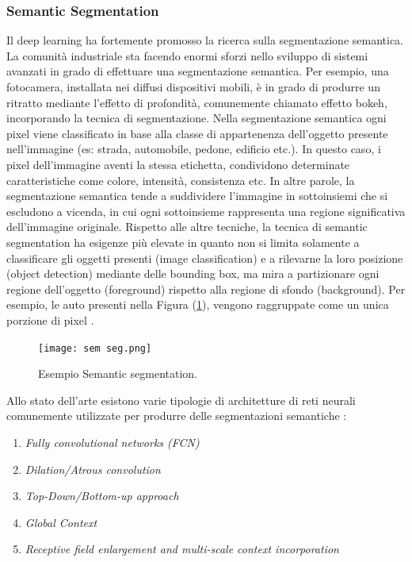 \subsubsection{Semantic Segmentation}
Il deep learning ha fortemente promosso la ricerca sulla segmentazione semantica. 
La comunità industriale sta facendo enormi sforzi nello sviluppo di sistemi avanzati 
in grado di effettuare una segmentazione semantica. Per esempio, una fotocamera, 
installata nei diffusi dispositivi mobili, è in grado di produrre un ritratto mediante 
l'effetto di profondità, comunemente chiamato effetto bokeh, incorporando la tecnica 
di segmentazione. Nella segmentazione semantica ogni pixel viene classificato 
in base alla classe di appartenenza dell'oggetto presente nell'immagine (es: strada, 
automobile, pedone, edificio etc.). In questo caso, i pixel dell'immagine aventi la 
stessa etichetta, condividono determinate caratteristiche come colore, intensità, 
consistenza etc. In altre parole, la segmentazione semantica tende a suddividere 
l'immagine in sottoinsiemi che si escludono a vicenda, in cui ogni sottoinsieme 
rappresenta una regione significativa dell'immagine originale. Rispetto alle altre 
tecniche, la tecnica di semantic segmentation ha esigenze più elevate in quanto 
non si limita solamente a classificare gli oggetti presenti (image classification) e a 
rilevarne la loro posizione (object detection) mediante delle bounding box, ma 
mira a partizionare ogni regione dell'oggetto (foreground) rispetto alla regione 
di sfondo (background). Per esempio, le auto presenti nella Figura (\ref{semantic segmentation}), vengono 
raggruppate come un unica porzione di pixel \cite{aurelien}.
\begin{figure}
    \centering
    \texttt{[image: sem seg.png]}
    \centering
    \caption{Esempio Semantic segmentation.}
    \label{semantic segmentation}
\end{figure}
Allo stato dell'arte esistono varie tipologie di architetture di reti neurali 
comunemente utilizzate per produrre delle segmentazioni semantiche \cite{semantic_segmentation_networks}:
\begin{enumerate}
    \item \emph{Fully convolutional networks (FCN)}
    \item \emph{Dilation/Atrous convolution}
    \item \emph{Top-Down/Bottom-up approach}
    \item \emph{Global Context}
    \item \emph{Receptive field enlargement and multi-scale context incorporation}
\end{enumerate}

